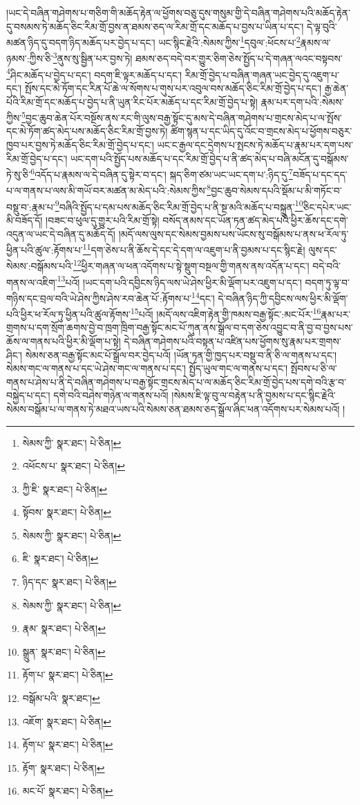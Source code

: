 །ཡང་དེ་བཞིན་གཤེགས་པ་གཅིག་གི་མཆོད་རྟེན་ལ་ཕྱོགས་བཅུ་དུས་གསུམ་གྱི་དེ་བཞིན་གཤེགས་པའི་མཆོད་རྟེན་དུ་བསམས་ཏེ་མཆོད་ཅིང་རིམ་གྲོ་བྱས་ན་ཐམས་ཅད་ལ་རིམ་གྲོ་དང་མཆོད་པ་བྱས་པ་ཡིན་པ་དང་། དེ་ལྟ་བུའི་མཚན་ཉིད་དུ་བདག་ཉིད་མཆོད་པར་བྱེད་པ་དང་། ཡང་སྙིང་རྗེའི་:སེམས་ཀྱིས་\footnote{སེམས་ཀྱི་  སྣར་ཐང་།  པེ་ཅིན། }དབུལ་:ཕོངས་པ་\footnote{འཕོངས་པ་  སྣར་ཐང་།  པེ་ཅིན། }རྣམས་ལ་ཉམས་:ཀྱིས་ཅི་\footnote{ཀྱི་ཇི་  སྣར་ཐང་།  པེ་ཅིན། }ནུས་སུ་སྦྱིན་པར་བྱས་ཏེ། ཐམས་ཅད་བདེ་བར་གྱུར་ཅིག་ཅེས་སྤྱོད་པ་དེ་གཞན་ལའང་བསྟབས་\footnote{སྟོབས་  སྣར་ཐང་།  པེ་ཅིན། }ཤིང་མཆོད་པ་བྱེད་པ་དང་། བདག་ཇི་ལྟར་མཆོད་པ་དང་། རིམ་གྲོ་བྱེད་པ་བཞིན་གཞན་ཡང་བྱེད་དུ་འཇུག་པ་དང་། སྤོས་དང་མེ་ཏོག་དང་རིན་པོ་ཆེ་ལ་སོགས་པ་གུས་པར་འབུལ་བས་མཆོད་ཅིང་རིམ་གྲོ་བྱེད་པ་དང་། རྒྱ་ཆེན་པོའི་རིམ་གྲོ་དང་མཆོད་པ་བྱེད་པ་ནི་ཡུན་རིང་པོར་མཆོད་པ་དང་རིམ་གྲོ་བྱེད་པ་སྟེ། རྣམ་པར་དག་པའི་:སེམས་ཀྱིས་\footnote{སེམས་ཀྱི་  སྣར་ཐང་།  པེ་ཅིན། }བྱང་ཆུབ་ཆེན་པོར་བསྔོས་ནས་རང་གི་ལུས་བརྒྱ་སྟོང་དུ་མས་དེ་བཞིན་གཤེགས་པ་གྲངས་མེད་པ་ལ་སྤོས་དང་མེ་ཏོག་ཚད་མེད་པས་མཆོད་ཅིང་རིམ་གྲོ་བྱས་ཏེ། ཚིག་སྙན་པ་དང་ཡིད་དུ་འོང་བ་གྲངས་མེད་པ་ཕྱོགས་བཅུར་ཁྱབ་པར་བྱས་ཏེ་མཆོད་ཅིང་རིམ་གྲོ་བྱེད་པ་དང་། ཡང་ང་རྒྱལ་དང་དྲེགས་པ་སྤངས་ཏེ་མཆོད་པ་རྣམ་པར་དག་པས་རིམ་གྲོ་བྱེད་པ་དང་། ཡང་དག་པའི་སྤྱོད་པས་མཆོད་པ་དང་རིམ་གྲོ་བྱེད་པ་ནི་ཚད་མེད་པ་བཞི་མངོན་དུ་བསྒོམས་ཏེ་སུ་ཅི་\footnote{ཇི་  སྣར་ཐང་།  པེ་ཅིན། }འདོད་པ་རྣམས་ལ་དེ་བཞིན་དུ་སྟེར་བ་དང་། སྐད་ཅིག་ཙམ་ཡང་ཡང་དག་པ་:ཉིད་དུ་\footnote{ཉིད་དང་  སྣར་ཐང་།  པེ་ཅིན། }བཟོད་པ་དང་དད་པ་ལ་གནས་པ་ལས་མི་གཡོ་བར་མཚན་མ་མེད་པའི་:སེམས་ཀྱིས་\footnote{སེམས་ཀྱི་  སྣར་ཐང་།  པེ་ཅིན། }བྱང་ཆུབ་སེམས་དཔའི་སྡོམ་པ་མི་གཏོང་བ་བསྡུ་བ་:རྣམ་པ་\footnote{རྣམ་  སྣར་ཐང་།  པེ་ཅིན། }བཞིའི་སྤྱོད་པ་དམ་པས་མཆོད་ཅིང་རིམ་གྲོ་བྱེད་པ་ནི་སྔ་མའི་མཆོད་པ་བསྐྲུན་\footnote{སྒྲུན་  སྣར་ཐང་།  པེ་ཅིན། }ཅིང་དཔེར་ཡང་མི་བཟོད་དོ། །བཟང་བ་ཕུལ་དུ་གྱུར་པའི་རིམ་གྲོ་སྟེ། བསོད་ནམས་དང་ཡོན་ཏན་ཚད་མེད་པའི་ཕྱིར་ཆོས་དང་དགེ་འདུན་ལ་ཡང་དེ་བཞིན་དུ་མཆོད་དོ། །མདོ་ལས་ལུས་དང་སེམས་བྱམས་པས་ཡོངས་སུ་བསྒོམས་པ་ནས་ཕ་རོལ་ཏུ་ཕྱིན་པའི་ཚུལ་:རྟོགས་པ་\footnote{རྟོག་པ་  སྣར་ཐང་།  པེ་ཅིན། }དག་ཅེས་པ་ནི་ཆོས་དེ་དང་དེ་དག་ལ་འཇུག་པ་ནི་བྱམས་པ་དང་སྙིང་རྗེ། ལུས་དང་སེམས་:བསྒོམས་པའི་\footnote{བསྒོམ་པའི་  སྣར་ཐང་། }ཕྱིར་གཞན་ལ་ཕན་འདོགས་པ་སྟེ་སྡུག་བསྔལ་གྱི་གནས་ནས་འདོན་པ་དང་། བདེ་བའི་གནས་ལ་འཇིག་\footnote{འཇོག་  སྣར་ཐང་།  པེ་ཅིན། }པའོ། །ཡང་དག་པའི་དབྱིངས་ཉིད་ལས་ཡེ་ཤེས་ཕྱིར་མི་ལྡོག་པར་འཇུག་པ་དང་། བདག་ཏུ་ལྟ་བ་གཉིས་དང་བྲལ་བའི་ཡེ་ཤེས་ཀྱིས་ཤེས་རབ་ཆེན་པོ་:རྟོགས་པ་\footnote{རྟོག་པ་  སྣར་ཐང་།  པེ་ཅིན། }དང་། དེ་བཞིན་ཉིད་ཀྱི་དབྱིངས་ལས་ཕྱིར་མི་ལྡོག་པའི་ཕྱིར་ཕ་རོལ་ཏུ་ཕྱིན་པའི་ཚུལ་རྟོགས་\footnote{རྟོག་  སྣར་ཐང་།  པེ་ཅིན། }པའོ། །མདོ་ལས་འཇིག་རྟེན་གྱི་ཁམས་བརྒྱ་སྟོང་:མང་པོར་\footnote{མང་པོ་  སྣར་ཐང་།  པེ་ཅིན། }རྣམ་པར་གྲགས་པ་དག་སྲོག་ཆགས་བྱེ་བ་ཁྲག་ཁྲིག་བརྒྱ་སྟོང་མང་པོ་ཀུན་ནས་སྒྲོལ་བ་དག་ཅེས་འབྱུང་བ་ནི་བྱ་བ་བྱས་པས་ཆོས་ལ་གནས་པའི་ཕྱིར་མི་ལྡོག་པ་སྟེ། དེ་བཞིན་གཤེགས་པའི་བསྟན་པ་འཛིན་པས་ཕྱོགས་སུ་རྣམ་པར་གྲགས་ཤིང་། སེམས་ཅན་བརྒྱ་སྟོང་མང་པོ་སྒྲོལ་བར་བྱེད་པའོ། །ཡོན་ཏན་གྱི་ཁྱད་པར་བསྡུ་བ་ནི་ཅི་ལ་གནས་པ་དང་། སེམས་གང་ལ་གནས་པ་དང་ཡེ་ཤེས་གང་ལ་གནས་པ་དང་། སྤྱོད་ཡུལ་གང་ལ་གནས་པ་དང་། སྤོབས་པ་ཅི་ལ་གནས་པ་ཤེས་པ་ནི་དེ་བཞིན་གཤེགས་པ་བརྒྱ་སྟོང་གྲངས་མེད་པ་ལ་མཆོད་ཅིང་རིམ་གྲོ་བྱེད་པས་དགེ་བའི་རྩ་བ་བསྐྱེད་པ་དང་། དགེ་བའི་བཤེས་གཉེན་ལ་གནས་པའོ། །སེམས་ཇི་ལྟ་བུ་ལ་བརྟེན་པ་ནི་བྱམས་པ་དང་སྙིང་རྗེའི་སེམས་བསྒོམ་པ་ལ་གནས་ཏེ་མཐའ་ཡས་པའི་སེམས་ཅན་ཐམས་ཅད་སྒྲོལ་ཞིང་ཕན་འདོགས་པར་སེམས་པའོ། །
